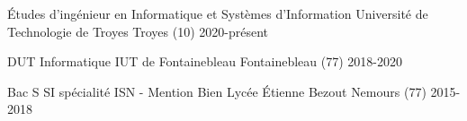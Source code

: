 

\begin{cventries}

  \cventry
    {Études d'ingénieur en Informatique et Systèmes d'Information} %
    {Université de Technologie de Troyes} %
    {Troyes (10)} %
    {2020-présent} %
    {}

  \cventry
    {DUT Informatique} %
    {IUT de Fontainebleau} %
    {Fontainebleau (77)} %
    {2018-2020} %
    {}

  \cventry
    {Bac S SI spécialité ISN - Mention Bien} %
    {Lycée Étienne Bezout} %
    {Nemours (77)} %
    {2015-2018} %
    {}

\end{cventries}
